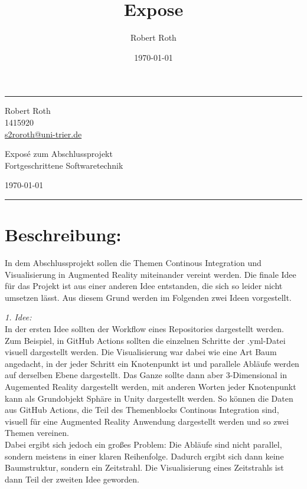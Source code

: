 \documentclass{article}
\author{Robert Roth}
\date{\today}
\title{Expose}
\makeatletter
\newcommand{\name}{Robert Roth}
\newcommand{\matrikelnr}{1415920}
\newcommand{\email}{s2roroth@uni-trier.de}
\newcommand{\titelname}{Exposé zum Abschlussprojekt}
\newcommand{\vorlesung}{Fortgeschrittene Softwaretechnik}
\makeatother
\begin{document}
\fancyhead[C]{}
\hrule \medskip %
\begin{minipage}{0.295\textwidth} 
\raggedright
\footnotesize
\name \hfill\\   
\matrikelnr\hfill\\
\href{mailto:\email}{\email} 
\end{minipage}
\begin{minipage}{0.4\textwidth} 
\centering 
\large 
\titelname\\ 
\normalsize 
\vorlesung\\ 
\end{minipage}
\begin{minipage}{0.295\textwidth} 
\raggedleft
\today\hfill\\
\end{minipage}
\medskip\hrule 
\bigskip
\section*{Beschreibung:}
\label{sec:org8b6a606}
In dem Abschlussprojekt sollen die Themen Continous Integration und Visualisierung in Augmented Reality miteinander vereint werden. Die finale Idee für das Projekt ist aus einer anderen Idee entstanden, die sich so leider nicht umsetzen lässt. Aus diesem Grund werden im Folgenden zwei Ideen vorgestellt.

\emph{1. Idee:}\\[0pt]
In der ersten Idee sollten der Workflow eines Repositories dargestellt werden. Zum Beispiel, in GitHub Actions sollten die einzelnen Schritte der .yml-Datei visuell dargestellt werden. Die Visualisierung war dabei wie eine Art Baum angedacht, in der jeder Schritt ein Knotenpunkt ist und parallele Abläufe werden auf derselben Ebene dargestellt. Das Ganze sollte dann aber 3-Dimensional in Augemented Reality dargestellt werden, mit anderen Worten jeder Knotenpunkt kann als Grundobjekt Sphäre in Unity dargestellt werden. So können die Daten aus GitHub Actions, die Teil des Themenblocks Continous Integration sind, visuell für eine Augmented Reality Anwendung dargestellt werden und so zwei Themen vereinen.\\[0pt]
Dabei ergibt sich jedoch ein großes Problem: Die Abläufe sind nicht parallel, sondern meistens in einer klaren Reihenfolge. Dadurch ergibt sich dann keine Baumstruktur, sondern ein Zeitstrahl. Die Visualisierung eines Zeitstrahls ist dann Teil der zweiten Idee geworden.
\end{document}
